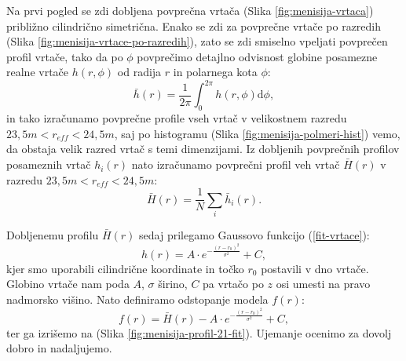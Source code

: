 \documentclass[a4paper, twoside, 12pt]{book}
\begin{document}
Na prvi pogled se zdi dobljena povprečna vrtača (Slika \ref{fig:menisija-vrtaca}) približno cilindrično simetrična. Enako se zdi za povprečne vrtače po razredih (Slika \ref{fig:menisija-vrtace-po-razredih}), zato se zdi smiselno vpeljati povprečen profil vrtače, tako da po $\phi$ povprečimo detajlno odvisnost globine posamezne realne vrtače $h(r,\phi)$ od radija $r$ in polarnega kota $\phi$:
\begin{equation} 
  \bar h(r) = \frac{1}{2 \pi} \int_0^{2\pi} h(r,\phi) \mathrm{d}\phi,
  \label{povprecenje-phi}
\end{equation}
in tako izračunamo povprečne profile vseh vrtač v velikostnem razredu \newline $23,5m < r_{eff} < 24,5m$, saj po histogramu (Slika \ref{fig:menisija-polmeri-hist}) vemo, da obstaja velik razred vrtač s temi dimenzijami. Iz dobljenih povprečnih profilov posameznih vrtač $h_i(r)$ nato izračunamo povprečni profil veh vrtač $\bar H (r)$ v razredu $23,5m < r_{eff} < 24,5m$:
\begin{equation} 
  \bar H(r) = \frac{1}{N} \sum_{i} \bar h_i(r).
  \label{povprecenje-profilov}
\end{equation}

Dobljenemu profilu $\bar H(r)$ sedaj prilegamo Gaussovo funkcijo (\ref{fit-vrtace}):
\begin{equation}
  h(r) = A \cdot e^{-\frac{(r-r_0)^2}{\sigma^2}} + C,
  \label{fit-vrtace}
\end{equation}
kjer smo uporabili cilindrične koordinate in točko $r_0$ postavili v dno vrtače. Globino vrtače nam poda $A$, $\sigma$ širino, $C$ pa vrtačo po $z$ osi umesti na pravo nadmorsko višino. Nato definiramo odstopanje modela $f(r)$:
\begin{equation}
  f(r) = \bar{H}(r) - A \cdot e^{-\frac{(r-r_0)^2}{\sigma^2}} + C,
  \label{ujemanje-fita}
\end{equation}
ter ga izrišemo na (Slika \ref{fig:menisija-profil-21-fit}). Ujemanje ocenimo za dovolj dobro in nadaljujemo.
\end{document}
